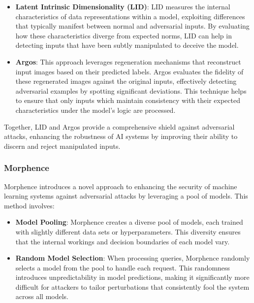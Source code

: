 \documentclass[letterpaper,twocolumn,10pt]{article}
\begin{document}
\begin{itemize}
    \item \textbf{Latent Intrinsic Dimensionality (LID)}: LID measures the internal characteristics of data representations within a model, exploiting differences that typically manifest between normal and adversarial inputs. By evaluating how these characteristics diverge from expected norms, LID can help in detecting inputs that have been subtly manipulated to deceive the model.

    \item \textbf{Argos}: This approach leverages regeneration mechanisms that reconstruct input images based on their predicted labels. Argos evaluates the fidelity of these regenerated images against the original inputs, effectively detecting adversarial examples by spotting significant deviations. This technique helps to ensure that only inputs which maintain consistency with their expected characteristics under the model's logic are processed.
\end{itemize}

Together, LID and Argos provide a comprehensive shield against adversarial attacks, enhancing the robustness of AI systems by improving their ability to discern and reject manipulated inputs.


\subsubsection{Morphence}

Morphence introduces a novel approach to enhancing the security of machine learning systems against adversarial attacks by leveraging a pool of models. This method involves:

\begin{itemize}
    \item \textbf{Model Pooling}: Morphence creates a diverse pool of models, each trained with slightly different data sets or hyperparameters. This diversity ensures that the internal workings and decision boundaries of each model vary.
    
    \item \textbf{Random Model Selection}: When processing queries, Morphence randomly selects a model from the pool to handle each request. This randomness introduces unpredictability in model predictions, making it significantly more difficult for attackers to tailor perturbations that consistently fool the system across all models.
\end{itemize}
\end{document}

